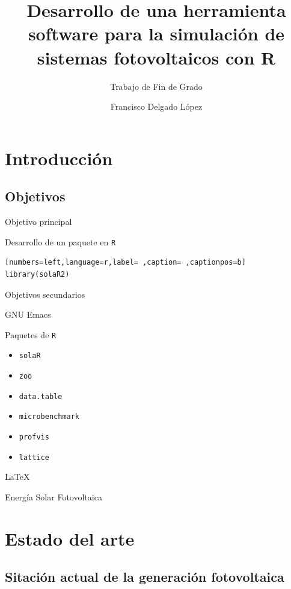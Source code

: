 \documentclass[aspectratio=169, usenames,svgnames,dvipsnames]{beamer}
\author{Francisco Delgado López}
\date{}
\title{Desarrollo de una herramienta software para la simulación de sistemas fotovoltaicos con R}
\subtitle{Trabajo de Fin de Grado}
\institute[UPM]{Universidad Politécnica de Madrid}
\begin{document}
\maketitle

\section{Introducción}
\label{sec:org9ddae57}
\subsection{Objetivos}
\label{sec:org9375a05}
\begin{frame}[label={sec:org8a97f6b},fragile]{Objetivo principal}
 \begin{block}{Desarrollo de un paquete en \texttt{R}}
\begin{lstlisting}[numbers=left,language=r,label= ,caption= ,captionpos=b]
library(solaR2)
\end{lstlisting}
\end{block}
\end{frame}

\begin{frame}[label={sec:org8c82a57},fragile]{Objetivos secundarios}
 \begin{block}{GNU Emacs}
\end{block}
\begin{block}{Paquetes de \texttt{R}}
\begin{itemize}
\item \texttt{solaR}
\item \texttt{zoo}
\item \texttt{data.table}
\item \texttt{microbenchmark}
\item \texttt{profvis}
\item \texttt{lattice}
\end{itemize}
\end{block}
\begin{block}{\LaTeX{}}
\end{block}
\begin{block}{Energía Solar Fotovoltaica}
\end{block}
\end{frame}

\section{Estado del arte}
\label{sec:org7a08592}
\subsection{Sitación actual de la generación fotovoltaica}
\label{sec:org8db2009}
\end{document}
